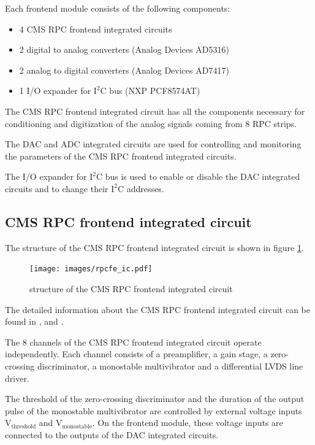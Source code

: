 \documentclass[12pt, a4paper]{article}
\begin{document}
Each frontend module consists of the following components:
\begin{itemize}[nosep]
  \item 4 CMS RPC frontend integrated circuits \cite{rpcnim2000}
  \item 2 digital to analog converters (Analog Devices AD5316) \cite{ad5316}
  \item 2 analog to digital converters (Analog Devices AD7417) \cite{ad7417}
  \item 1 I/O expander for $\text{I}^\text{2}\text{C}$ bus (NXP PCF8574AT) \cite{pcf8574t}
\end{itemize}

The CMS RPC frontend integrated circuit has all the components necessary for conditioning and digitization of the analog signals coming from 8 RPC strips.

The DAC and ADC integrated circuits are used for controlling and monitoring the parameters of the CMS RPC frontend integrated circuits.

The I/O expander for $\text{I}^\text{2}\text{C}$ bus is used to enable or disable the DAC integrated circuits and to change their $\text{I}^\text{2}\text{C}$ addresses.

\subsection{CMS RPC frontend integrated circuit}

The structure of the CMS RPC frontend integrated circuit is shown in figure \ref{fig:rpcfe_ic}.

\begin{figure}[h!]
  \centering
  \texttt{[image: images/rpcfe\_ic.pdf]}
  \caption{structure of the CMS RPC frontend integrated circuit}
  \label{fig:rpcfe_ic}
\end{figure}

The detailed information about the CMS RPC frontend integrated circuit can be found in \cite{rpcnim2000}, \cite{lhcb2002} and \cite{rpcreview2000}.

The 8 channels of the CMS RPC frontend integrated circuit operate independently. Each channel consists of a preamplifier, a gain stage, a zero-crossing discriminator, a monostable multivibrator and a differential LVDS line driver.

The threshold of the zero-crossing discriminator and the duration of the output pulse of the monostable multivibrator are controlled by external voltage inputs $\text{V}_\text{threshold}$ and $\text{V}_\text{monostable}$. On the frontend module, these voltage inputs are connected to the outputs of the DAC integrated circuits.
\end{document}
